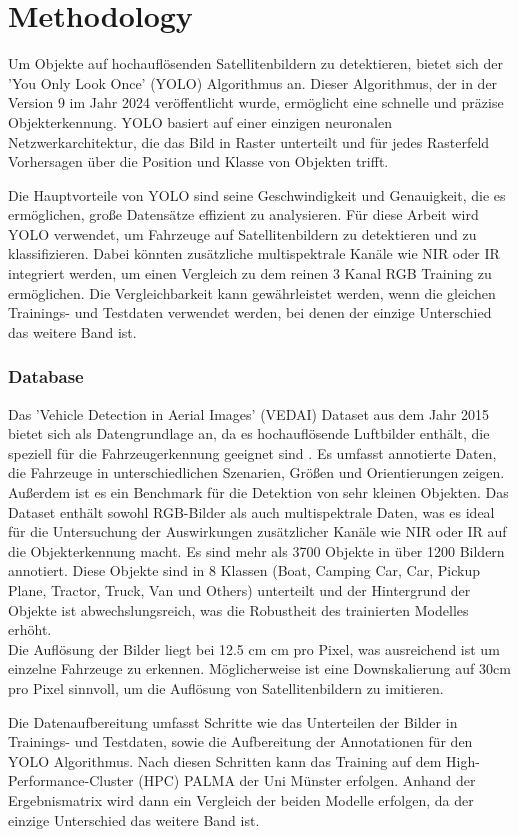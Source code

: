 \chapter{Methodology}
\label{ch:methodology}

\ifimportant

Um Objekte auf hochauflösenden Satellitenbildern zu detektieren, bietet sich der 'You Only Look Once' (YOLO) Algorithmus an. Dieser Algorithmus, der in der Version 9 im Jahr 2024 veröffentlicht wurde, ermöglicht eine schnelle und präzise Objekterkennung. YOLO basiert auf einer einzigen neuronalen Netzwerkarchitektur, die das Bild in Raster unterteilt und für jedes Rasterfeld Vorhersagen über die Position und Klasse von Objekten trifft. 

Die Hauptvorteile von YOLO sind seine Geschwindigkeit und Genauigkeit, die es ermöglichen, große Datensätze effizient zu analysieren. Für diese Arbeit wird YOLO verwendet, um Fahrzeuge auf Satellitenbildern zu detektieren und zu klassifizieren. Dabei könnten zusätzliche multispektrale Kanäle wie NIR oder IR integriert werden, um einen Vergleich zu dem reinen 3 Kanal RGB Training zu ermöglichen. Die Vergleichbarkeit kann gewährleistet werden, wenn die gleichen Trainings- und Testdaten verwendet werden, bei denen der einzige Unterschied das weitere Band ist.

\subsection*{Database}

Das 'Vehicle Detection in Aerial Images' (VEDAI) Dataset \cite{vedai_web}  aus dem Jahr 2015 bietet sich als Datengrundlage an, da es hochauflösende Luftbilder enthält, die speziell für die Fahrzeugerkennung geeignet sind \cite{Razakarivony2015}. Es umfasst annotierte Daten, die Fahrzeuge in unterschiedlichen Szenarien, Größen und Orientierungen zeigen. Außerdem ist es ein Benchmark für die Detektion von sehr kleinen Objekten. Das Dataset enthält sowohl RGB-Bilder als auch multispektrale Daten, was es ideal für die Untersuchung der Auswirkungen zusätzlicher Kanäle wie NIR oder IR auf die Objekterkennung macht. Es sind mehr als 3700 Objekte in über 1200 Bildern annotiert. Diese Objekte sind in 8 Klassen (Boat, Camping Car, Car, Pickup Plane, Tractor, Truck, Van und Others) unterteilt und der Hintergrund der Objekte ist abwechslungsreich, was die Robustheit des trainierten Modelles erhöht. \\
Die Auflösung der Bilder liegt bei 12.5 cm  cm pro Pixel, was ausreichend ist um einzelne Fahrzeuge zu erkennen. Möglicherweise ist eine Downskalierung auf 30cm pro Pixel sinnvoll, um die Auflösung von Satellitenbildern zu imitieren.
 

Die Datenaufbereitung umfasst Schritte wie das Unterteilen der Bilder in Trainings- und Testdaten, sowie die Aufbereitung der Annotationen für den YOLO Algorithmus. Nach diesen Schritten kann das Training auf dem High-Performance-Cluster (HPC) PALMA der Uni Münster erfolgen. Anhand der Ergebnismatrix wird dann ein Vergleich der beiden Modelle erfolgen, da der einzige Unterschied das weitere Band ist. 
\else
\blindtext
\fi

